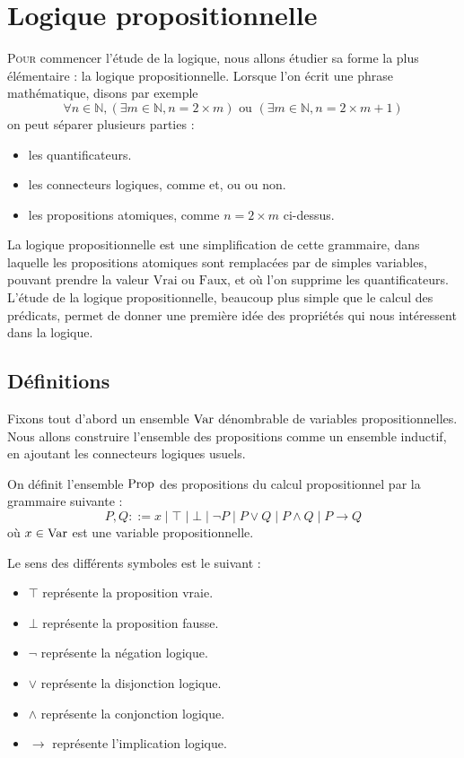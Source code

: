 \chapter{Logique propositionnelle}
\label{chp.logprop}

\minitoc

\lettrine{P}{our} commencer l'étude de la logique, nous allons étudier sa forme
la plus élémentaire : la logique propositionnelle. Lorsque l'on écrit une phrase
mathématique, disons par exemple
\[\forall n \in \mathbb N, (\exists m \in \mathbb N, n = 2\times m) \text{ ou }
(\exists m \in \mathbb N, n = 2 \times m + 1)\]
on peut séparer plusieurs parties :
\begin{itemize}
\item les quantificateurs.
\item les connecteurs logiques, comme \og et\fg{}, \og ou\fg{} ou \og non\fg{}.
\item les propositions atomiques, comme $n = 2 \times m$ ci-dessus.
\end{itemize}

La logique propositionnelle est une simplification de cette grammaire, dans
laquelle les propositions atomiques sont remplacées par de simples variables,
pouvant prendre la valeur $\mathrm{Vrai}$ ou $\mathrm{Faux}$, et où l'on
supprime les quantificateurs. L'étude de la logique propositionnelle, beaucoup
plus simple que le calcul des prédicats, permet de donner une première idée des
propriétés qui nous intéressent dans la logique.

\section{Définitions}

Fixons tout d'abord un ensemble $\operatorname{Var}$ dénombrable de variables
propositionnelles. Nous allons construire l'ensemble des propositions comme un
ensemble inductif, en ajoutant les connecteurs logiques usuels.

\begin{definition}[Propositions]
  On définit l'ensemble $\operatorname{Prop}$ des propositions du calcul
  propositionnel par la grammaire suivante :
  \[P,Q ::= x \mid \top \mid \bot \mid \lnot P \mid P \lor Q \mid P \land Q
  \mid P \to Q\]
  où $x\in \operatorname{Var}$ est une variable propositionnelle.
\end{definition}

Le sens des différents symboles est le suivant :
\begin{itemize}
\item $\top$ représente la proposition vraie.
\item $\bot$ représente la proposition fausse.
\item $\lnot$ représente la négation logique.
\item $\lor$ représente la disjonction logique.
\item $\land$ représente la conjonction logique.
\item $\to$ représente l'implication logique.
\end{itemize}


